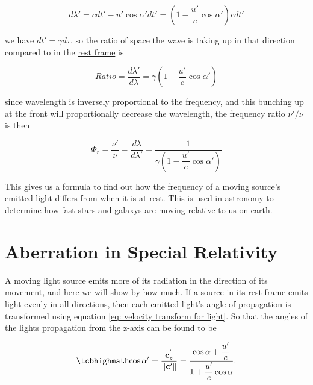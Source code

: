 \begin{equation}
	{d\lambda{'}} = {c}{dt{'}}-{u}{'} \cos\alpha{'} {dt{'}} = (1-\frac{u{'}}{c}\cos\alpha{'})cdt{'}
\end{equation}

we have ${dt{'}} = {\gamma} {d\tau}$, so the ratio of space the wave is taking up in that direction compared to in the \hyperlink{def-proper-frame}{rest frame} is

\begin{equation}
	Ratio = \frac{d\lambda{'}}{d\lambda} = {\gamma} \left(1-\dfrac{u{'}}{c} \cos\alpha{'} \right)
\end{equation}

since wavelength is inversely proportional to the frequency, and this bunching up at the front will proportionally decrease the wavelength, the frequency ratio $\nu{'}/\nu$ is then

\begin{equation}
	\Phi_{r} = \frac{\nu{'}}{\nu} = \frac{d\lambda}{d\lambda{'}} = \frac{1}{ {\gamma} \left(1-\dfrac{u{'}}{c} \cos\alpha{'} \right)}
\end{equation}

This gives us a formula to find out how the frequency of a moving source's emitted light differs from when it is at rest.
This is used in astronomy to determine how fast stars and galaxys are moving relative to us on earth.


\section{Aberration in Special Relativity} \label{sect: Aberration in Special Relativity}

A moving light source emits more of its radiation in the direction of its movement, and here we will show by how much.
If a source in its rest frame emits light evenly in all directions, then each emitted light's angle of propagation is transformed using equation \eqref{eq: velocity transform for light}.
So that the angles of the lights propagation from the z-axis can be found to be

\begin{equation}
	\label{eq: Cosine transform}
	\mhl{
		\cos\alpha{'} = \frac{\mathbf{c}_{z}^{'}}{\|\mathbf{c}{'}\|} = \dfrac{\cos\alpha + \dfrac{u{'}}{c}}{1 + \dfrac{u{'}}{c}\cos\alpha}.
	}
\end{equation}

